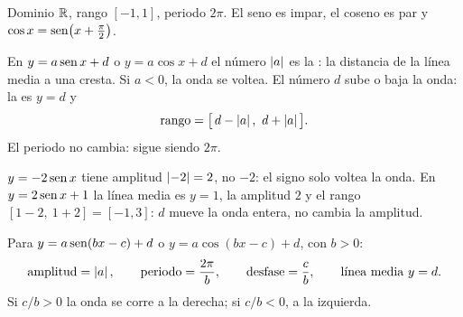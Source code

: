 \documentclass[11pt,a4paper]{article}
\let\nivelorig\nivel
\renewcommand{\nivel}[2]{\Needspace{8\baselineskip}\nivelorig{#1}{#2}}
\begin{document}
\begin{propiedad}
Dominio $\mathbb{R}$, rango $[-1,1]$, periodo $2\pi$. El seno es impar, el coseno es par y $\cos x=\operatorname{sen}\!\left(x+\tfrac{\pi}{2}\right)$.
\end{propiedad}

\begin{definicion}
En $y=a\operatorname{sen} x+d$ o $y=a\cos x+d$ el número $\left\lvert a\right\rvert$ es la : la distancia de la línea media a una
cresta. Si $a<0$, la onda se voltea. El número $d$ sube o baja la onda: la  es $y=d$ y
\[ \text{rango}=\bigl[\,d-\abs{a},\ d+\abs{a}\,\bigr]. \]
El periodo no cambia: sigue siendo $2\pi$.
\end{definicion}

\begin{figura}[Estirar, voltear y subir la onda: $y=3\sen x$, $y=-2\sen x$ y $y=2\sen x+1$ (línea media $y=1$ punteada).]
\end{figura}

\begin{ojo}
$y=-2\sen x$ tiene amplitud $\left\lvert -2\right\rvert=2$, no $-2$: el signo solo voltea la onda. En $y=2\sen x+1$ la línea media es
$y=1$, la amplitud $2$ y el rango $[1-2,\ 1+2]=[-1,3]$: $d$ mueve la onda entera, no cambia la amplitud.
\end{ojo}


\begin{definicion}
Para $y=a\operatorname{sen}(bx-c)+d$ o $y=a\cos(bx-c)+d$, con $b>0$:
\[ \text{amplitud}=\left\lvert a\right\rvert,\qquad \text{periodo}=\frac{2\pi}{b},\qquad \text{desfase}=\frac{c}{b},\qquad \text{línea media } y=d. \]
Si $c/b>0$ la onda se corre a la derecha; si $c/b<0$, a la izquierda.
\end{definicion}
\end{document}
